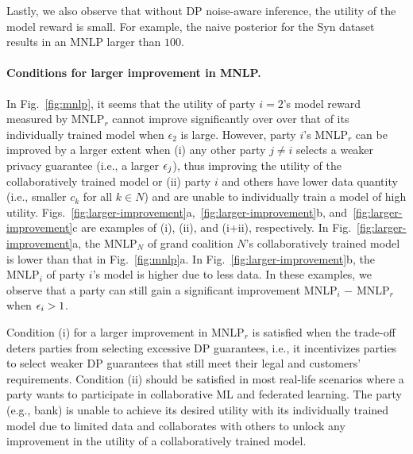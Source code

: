 \documentclass{article}
\theoremstyle{plain}
\theoremstyle{definition}
\theoremstyle{remark}
\begin{document}
Lastly, we also observe that without DP noise-aware inference, the utility of the model reward is small. For example, the naive posterior for the Syn dataset results in an MNLP larger than $100$.

\paragraph{Conditions for larger improvement in MNLP.}\label{app:subsec-larger-improve}

In Fig.~\ref{fig:mnlp}, it seems that the utility of party $i=2$'s model reward  measured by MNLP$_r$ cannot improve significantly over over that of its individually trained model when $\epsilon_2$ is large.
However, party $i$'s MNLP$_r$ can be improved by a larger extent when (i) any other party $j \neq i$ selects a weaker privacy guarantee (i.e., a larger ${\epsilon}_j$), thus improving the utility of the collaboratively trained model or (ii) party $i$ and others have lower data quantity (i.e., smaller $c_k$ for all $k \in N$) and are unable to  individually train a model of high utility. Figs.~\ref{fig:larger-improvement}a,~\ref{fig:larger-improvement}b, and~\ref{fig:larger-improvement}c are examples of (i), (ii), and (i+ii), respectively. In Fig.~\ref{fig:larger-improvement}a, the {MNLP}$_N$ of grand coalition $N$'s collaboratively trained model is lower than that in Fig.~\ref{fig:mnlp}a. In Fig.~\ref{fig:larger-improvement}b, the {MNLP}$_i$ of party $i$'s model is higher due to less data. In these examples, we observe that a party can still gain a significant improvement {MNLP}$_i$ $-$ {MNLP}$_r$ when ${\epsilon}_i > 1$.

Condition (i) for a larger improvement in MNLP$_r$ is satisfied when the trade-off deters parties from selecting excessive DP guarantees, i.e., it incentivizes parties to select weaker DP guarantees that still meet their legal and customers' requirements. Condition (ii) should be satisfied in most real-life scenarios where a party wants to participate in collaborative ML and federated learning. The party (e.g., bank) is unable to achieve its desired utility with its individually trained model due to limited data and collaborates with others to unlock any improvement in the utility of a collaboratively trained model.
\end{document}
